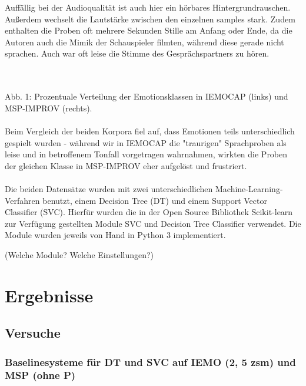 \documentclass{article} %
\begin{document}
Auffällig bei der Audioqualität ist auch hier ein hörbares Hintergrundrauschen. Außerdem wechselt die Lautstärke zwischen den einzelnen samples stark. Zudem enthalten die Proben oft mehrere Sekunden Stille am Anfang oder Ende, da die Autoren auch die Mimik der Schauspieler filmten, während diese gerade nicht sprachen. Auch war oft leise die Stimme des Gesprächspartners zu hören. \\ \\
 \\
Abb. 1: Prozentuale Verteilung der Emotionsklassen in IEMOCAP (links) und MSP-IMPROV (rechts). \\ \\
Beim Vergleich der beiden Korpora fiel auf, dass Emotionen teils unterschiedlich gespielt wurden - während wir in IEMOCAP die "traurigen" Sprachproben als leise und in betroffenem Tonfall vorgetragen wahrnahmen, wirkten die Proben der gleichen Klasse in MSP-IMPROV eher aufgelöst und frustriert. \\ \\
Die beiden Datensätze wurden mit zwei unterschiedlichen Machine-Learning-Verfahren benutzt, einem Decision Tree (DT) und einem Support Vector Classifier (SVC). Hierfür wurden die in der Open Source Bibliothek Scikit-learn zur Verfügung gestellten Module SVC und Decision Tree Classifier verwendet. Die Module wurden jeweils von Hand in Python 3 implementiert. 

(Welche Module? Welche Einstellungen?)

\section{Ergebnisse}

\subsection{Versuche}

\subsubsection{Baselinesysteme für DT und SVC auf IEMO (2, 5 zsm) und MSP (ohne P)}
\end{document}
